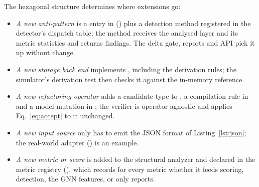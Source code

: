 The hexagonal structure determines where extensions go:
\begin{itemize}\tightlist
  \item \emph{A new anti-pattern} is a  entry in  () plus a detection method registered in the detector's dispatch table; the method receives the analysed layer and its metric statistics and returns findings. The delta gate, reports and API pick it up without change.
  \item \emph{A new storage back end} implements , including the derivation rules; the simulator's derivation test then checks it against the in-memory reference.
  \item \emph{A new refactoring operator} adds a candidate type to , a compilation rule in  and a model mutation in ; the verifier is operator-agnostic and applies Eq.~\eqref{eq:accept} to it unchanged.
  \item \emph{A new input source} only has to emit the JSON format of Listing~\ref{lst:json}; the real-world adapter () is an example.
  \item \emph{A new metric or score} is added to the structural analyzer and declared in the metric registry (), which records for every metric whether it feeds scoring, detection, the GNN features, or only reports.
\end{itemize}

